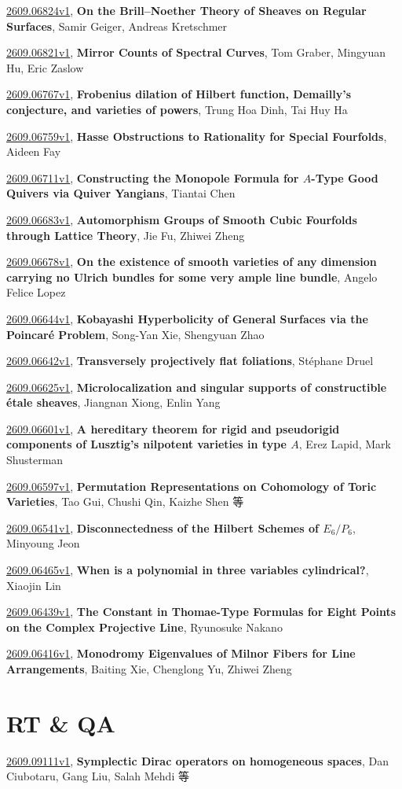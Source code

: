 \documentclass[9pt, a4paper]{article}
\theoremstyle{plain}
\theoremstyle{definition}
\theoremstyle{remark}
\newcommand{\arxiv}[3]{\href{https://arxiv.org/abs/#1}{#1}, \textbf{\textcolor{arxivblue}{#2}}, #3}
\begin{document}
\arxiv{2609.06824v1}{On the Brill--Noether Theory of Sheaves on Regular Surfaces}{Samir Geiger, Andreas Kretschmer}

\arxiv{2609.06821v1}{Mirror Counts of Spectral Curves}{Tom Graber, Mingyuan Hu, Eric Zaslow}

\arxiv{2609.06767v1}{Frobenius dilation of Hilbert function, Demailly's conjecture, and varieties of powers}{Trung Hoa Dinh, Tai Huy Ha}

\arxiv{2609.06759v1}{Hasse Obstructions to Rationality for Special Fourfolds}{Aideen Fay}

\arxiv{2609.06711v1}{Constructing the Monopole Formula for $A$-Type Good Quivers via Quiver Yangians}{Tiantai Chen}

\arxiv{2609.06683v1}{Automorphism Groups of Smooth Cubic Fourfolds through Lattice Theory}{Jie Fu, Zhiwei Zheng}

\arxiv{2609.06678v1}{On the existence of smooth varieties of any dimension carrying no Ulrich bundles for some very ample line bundle}{Angelo Felice Lopez}

\arxiv{2609.06644v1}{Kobayashi Hyperbolicity of General Surfaces via the Poincaré Problem}{Song-Yan Xie, Shengyuan Zhao}

\arxiv{2609.06642v1}{Transversely projectively flat foliations}{Stéphane Druel}

\arxiv{2609.06625v1}{Microlocalization and singular supports of constructible étale sheaves}{Jiangnan Xiong, Enlin Yang}

\arxiv{2609.06601v1}{A hereditary theorem for rigid and pseudorigid components of Lusztig's nilpotent varieties in type $A$}{Erez Lapid, Mark Shusterman}

\arxiv{2609.06597v1}{Permutation Representations on Cohomology of Toric Varieties}{Tao Gui, Chushi Qin, Kaizhe Shen 等}

\arxiv{2609.06541v1}{Disconnectedness of the Hilbert Schemes of $E_6/P_6$}{Minyoung Jeon}

\arxiv{2609.06465v1}{When is a polynomial in three variables cylindrical?}{Xiaojin Lin}

\arxiv{2609.06439v1}{The Constant in Thomae-Type Formulas for Eight Points on the Complex Projective Line}{Ryunosuke Nakano}

\arxiv{2609.06416v1}{Monodromy Eigenvalues of Milnor Fibers for Line Arrangements}{Baiting Xie, Chenglong Yu, Zhiwei Zheng}


\section{RT \& QA}
\arxiv{2609.09111v1}{Symplectic Dirac operators on homogeneous spaces}{Dan Ciubotaru, Gang Liu, Salah Mehdi 等}
\end{document}
